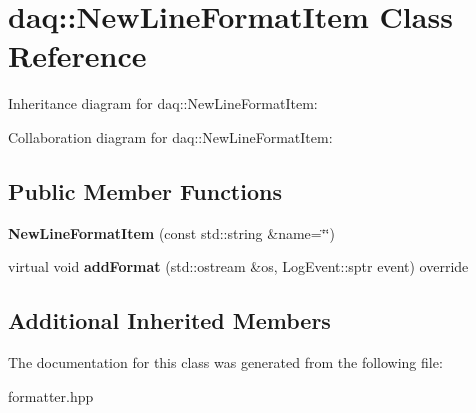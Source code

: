 \hypertarget{classdaq_1_1NewLineFormatItem}{}\section{daq\+:\+:New\+Line\+Format\+Item Class Reference}
\label{classdaq_1_1NewLineFormatItem}


Inheritance diagram for daq\+:\+:New\+Line\+Format\+Item\+:


Collaboration diagram for daq\+:\+:New\+Line\+Format\+Item\+:
\subsection*{Public Member Functions}
\begin{DoxyCompactItemize}
\item 
\mbox{\label{classdaq_1_1NewLineFormatItem_aa6f6e551d554f196fa55c91ae30c2633}} 
{\bfseries New\+Line\+Format\+Item} (const std\+::string \&name=\char`\"{}\char`\"{})
\item 
\mbox{\label{classdaq_1_1NewLineFormatItem_a1a2c7217c170fdb979da290de663693c}} 
virtual void {\bfseries add\+Format} (std\+::ostream \&os, Log\+Event\+::sptr event) override
\end{DoxyCompactItemize}
\subsection*{Additional Inherited Members}


The documentation for this class was generated from the following file\+:\begin{DoxyCompactItemize}
\item 
formatter.\+hpp\end{DoxyCompactItemize}
